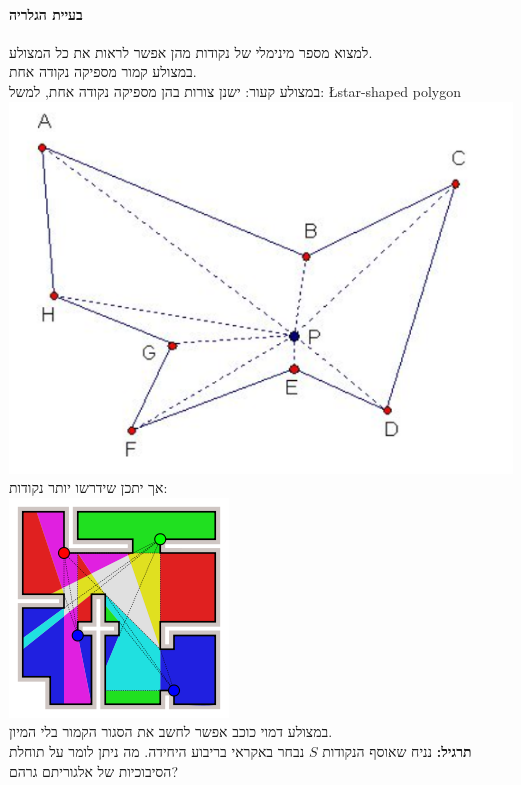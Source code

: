 \documentclass{article}
\begin{document}
\paragraph{בעיית הגלריה }
למצוא מספר מינימלי של נקודות מהן אפשר לראות את כל המצולע.\\
במצולע קמור מספיקה נקודה אחת.\\
במצולע קעור: ישנן צורות בהן מספיקה נקודה אחת, למשל: \L{star-shaped polygon}\\
\includegraphics[scale=0.3]{z3.png}
\\
אך יתכן שידרשו יותר נקודות:\\
\includegraphics[scale=0.3]{z2.png}
\\
במצולע דמוי כוכב אפשר לחשב את הסגור הקמור בלי המיון.\\
\textbf{תרגיל:} נניח שאוסף הנקודות $S$ נבחר באקראי בריבוע היחידה. מה ניתן לומר על תוחלת הסיבוכיות של אלגוריתם גרהם?
\end{document}
